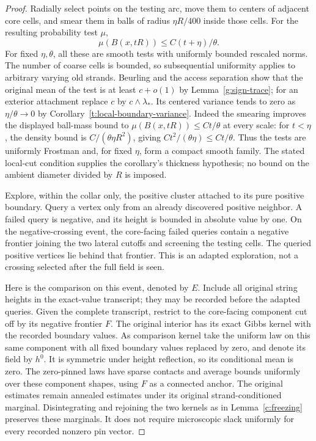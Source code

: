 \begin{proof}
Radially select points on the testing arc, move them to centers of
adjacent core cells, and smear them in balls of radius \(\eta R/400\)
inside those cells. For the resulting probability test \(\mu\),
\[
 \mu(B(x,tR))\leq C(t+\eta)/\theta.
\]
For fixed \(\eta,\theta\), all these are smooth tests with uniformly
bounded rescaled norms. The number of coarse cells is bounded, so
subsequential uniformity applies to arbitrary varying old strands.
Beurling and the access separation show that the original mean of
the test is at least \(c+o(1)\) by Lemma~\ref{g:sign-trace}; for
an exterior attachment replace \(c\) by \(c\wedge\lambda_*\).
Its centered variance tends to zero as \(\eta/\theta\to0\) by
Corollary~\ref{t:local-boundary-variance}. Indeed the smearing improves
the displayed ball-mass bound to \(\mu(B(x,tR))\leq Ct/\theta\)
at every scale: for \(t<\eta\), the density bound is
\(C/(\theta\eta R^2)\), giving \(Ct^2/(\theta\eta)\leq Ct/\theta\).
Thus the tests are uniformly Frostman and, for fixed \(\eta\), form
a compact smooth family. The stated local-cut condition supplies the
corollary's thickness hypothesis; no bound on the ambient diameter
divided by \(R\) is imposed.

Explore, within the collar only, the positive cluster attached to its
pure positive boundary. Query a vertex only from an already discovered
positive neighbor. A failed query is negative, and its height is
bounded in absolute value by one. On the negative-crossing event,
the core-facing failed queries contain a negative frontier joining
the two lateral cutoffs and screening the testing cells. The queried
positive vertices lie behind that frontier. This is an adapted
exploration, not a crossing selected after the full field is seen.

Here is the comparison on this event, denoted by $E$. Include all
original string heights in the exact-value transcript; they may be
recorded before the adapted queries. Given the complete transcript,
restrict to the core-facing component cut off by its negative frontier
$F$. The original interior has its exact Gibbs kernel with the
recorded boundary values. As comparison kernel take the uniform law
on this same component with all fixed boundary values replaced by
zero, and denote its field by $h^0$. It is symmetric under height
reflection, so its conditional mean is zero. The zero-pinned laws
have sparse contacts and average bounds uniformly over these component
shapes, using $F$ as a connected anchor. The original estimates remain
annealed estimates under its original strand-conditioned marginal.
Disintegrating and rejoining the two kernels as in
Lemma~\ref{c:freezing} preserves these marginals. It does not require
microscopic slack uniformly for every recorded nonzero pin vector.


\end{proof}
